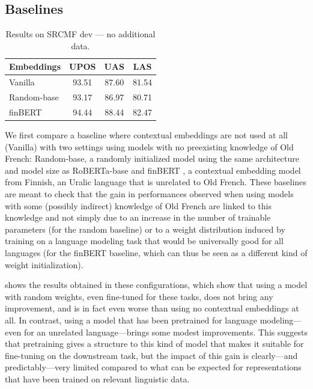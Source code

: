 \subsection{Baselines}\label{sec|baselines}
\begin{table}[thb]
    \centering
    \tablefontsize
    \begin{tabular}{l*{3}{S[table-format=2.2]}}
        \toprule
        {\textbf{Embeddings}} & {\textbf{UPOS}} & {\textbf{UAS}} & {\textbf{LAS}} \\
        \midrule
        Vanilla               & 93.51           & 87.60          & 81.54          \\
        Random-base           & 93.17           & 86.97          & 80.71          \\
        finBERT               & 94.44           & 88.44          & 82.47          \\
        \bottomrule
    \end{tabular}
    \caption{Results on SRCMF dev — no additional data.}\label{tab|nodata}
\end{table}

We first compare a baseline where contextual embeddings are not used at all (Vanilla) with two settings using models with no preexisting knowledge of Old French: Random-base, a randomly initialized model using the same architecture and model size as RoBERTa-base \citep{liu-etal-2019-roberta} %
and finBERT \citep{virtanen-etal-2019-multilingual}, a contextual embedding model from Finnish, an Uralic language that is unrelated to Old French.
These baselines are meant to check that the gain in performances observed when using models with some (possibly indirect) knowledge of Old French are linked to this knowledge and not simply due to an increase in the number of trainable parameters (for the random baseline) or to a weight distribution induced by training on a language modeling task that would be universally good for all languages (for the finBERT baseline, which can thus be seen as a different kind of weight initialization).

 shows the results obtained in these configurations, which show that using a model with random weights, even fine-tuned for these tasks, does not bring any improvement, and is in fact even worse than using no contextual embeddings at all.
In contrast, using a model that has been pretrained for language modeling---even for an unrelated language---brings some modest improvements.
This suggests that pretraining gives a structure to this kind of model that makes it suitable for fine-tuning on the downstream task, but the impact of this gain is clearly---and predictably---very limited compared to what can be expected for representations that have been trained on relevant linguistic data.

